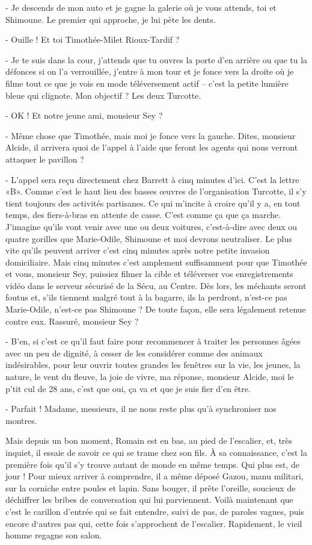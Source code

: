 - Je descends de mon auto et je gagne la galerie où je vous attends, toi et Shimoune. Le premier qui approche, je lui pète les dents.

- Ouille ! Et toi Timothée-Milet Rioux-Tardif ?

- Je te suis dans la cour, j’attends que tu ouvres la porte d’en arrière ou que tu la défonces si on l’a verrouillée, j’entre à mon tour et je fonce vers la droite où je filme tout ce que je vois en mode téléversement actif – c’est la petite lumière bleue qui clignote. Mon objectif ? Les deux Turcotte.

- OK ! Et notre jeune ami, monsieur Sey ?

- Même chose que Timothée, mais moi je fonce vers la gauche. Dites, monsieur Alcide, il arrivera quoi de l’appel à l’aide que feront les agents qui nous verront attaquer le pavillon ?

- L’appel sera reçu directement chez Barrett à cinq minutes d’ici. C’est la lettre «B». Comme c’est le haut lieu des basses œuvres de l’organisation Turcotte, il s’y tient toujours des activités partisanes. Ce qui m’incite à croire qu’il y a, en tout temps, des fiers-à-bras en attente de casse. C’est comme ça que ça marche. J’imagine qu’ils vont venir avec une ou deux voitures, c’est-à-dire avec deux ou quatre gorilles que Marie-Odile, Shimoune et moi devrons neutraliser. Le plus vite qu’ils peuvent arriver c’est cinq minutes après notre petite invasion domiciliaire. Mais cinq minutes c’est amplement suffisamment pour que Timothée et vous, monsieur Sey, puissiez filmer la cible et téléverser vos enregistrements vidéo dans le serveur sécurisé de la Sécu, au Centre. Dès lors, les méchants seront foutus et, s’ils tiennent malgré tout à la bagarre, ils la perdront, n’est-ce pas Marie-Odile, n’est-ce pas Shimoune ? De toute façon, elle sera légalement retenue contre eux. Rassuré, monsieur Sey ?

- B’en, si c’est ce qu’il faut faire pour recommencer à traiter les personnes âgées avec un peu de dignité, à cesser de les considérer comme des animaux indésirables, pour leur ouvrir toutes grandes les fenêtres sur la vie, les jeunes, la nature, le vent du fleuve, la joie de vivre, ma réponse, monsieur Alcide, moi le p’tit cul de 28 ans, c’est que oui, ça va et que je suis fier d’en être.

- Parfait ! Madame, messieurs, il ne nous reste plus qu’à synchroniser nos montres.

Mais depuis un bon moment, Romain est en bas, au pied de l’escalier, et, très inquiet, il essaie de savoir ce qui se trame chez son fils. À sa connaissance, c’est la première fois qu’il s’y trouve autant de monde en même temps. Qui plus est, de jour ! Pour mieux arriver à comprendre, il a même déposé Gazou, manu militari, sur la corniche entre poules et lapin. Sans bouger, il prête l’oreille, soucieux de déchiffrer les bribes de conversation qui lui parviennent. Voilà maintenant que c’est le carillon d’entrée qui se fait entendre, suivi de pas, de paroles vagues, puis encore d‘autres pas qui, cette fois s’approchent de l’escalier. Rapidement, le vieil homme regagne son salon.

